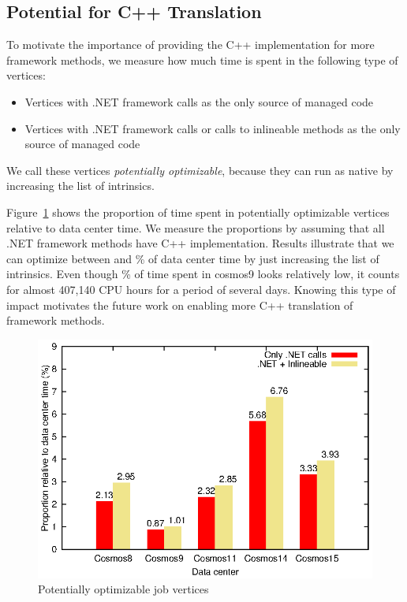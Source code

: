 \subsection{Potential for C++ Translation}
To motivate the importance of providing the C++ implementation for more framework methods, we measure how much time is spent in the following type of vertices:
\begin{itemize}
\item Vertices with .NET framework calls as the only source of managed code
\item Vertices with .NET framework calls or calls to inlineable methods as the only source of managed code
\end{itemize}
We call these vertices \emph{potentially optimizable}, because they can run as native by increasing the list of intrinsics.

Figure~\ref{fig:potentially} shows the proportion of time spent in potentially optimizable vertices relative to data center time. 
We measure the proportions by assuming that all .NET framework methods have C++ implementation.
Results illustrate that we can optimize between \potentiallyOptimizableL{} and \potentiallyOptimizableU{} \% of data center time by just increasing the list of intrinsics. 
Even though \potentiallyOptimizableL{} \% of time spent in cosmos9 looks relatively low, it counts for almost 407,140 CPU hours for a period of several days. 
Knowing this type of impact motivates the future work on enabling more C++ translation of framework methods.

\begin{figure}[ht]
\includegraphics[scale=0.8]{graphs/potentiallyOptimizable}

\caption{Potentially optimizable job vertices}
\label{fig:potentially}
\end{figure}

